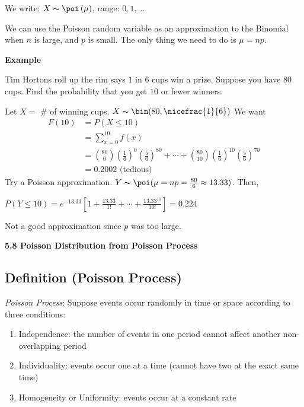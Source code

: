 We write: $ X \thicksim \poi\left(\mu\right) $, range: $ 0,1,\ldots $

We can use the Poisson random variable as an approximation to the Binomial
when $ n $ is large, and $ p $ is small. The only thing we need to do
is $ \mu=np $.

\textbf{Example}

Tim Hortons roll up the rim says $ 1 $ in $ 6 $ cups win a prize. Suppose
you have $ 80 $ cups. Find the probability that you get $ 10 $ or fewer
winners.

Let $ X= $ \# of winning cups. $ X \thicksim \bin(80,\nicefrac{1}{6}) $
We want
\begin{align*}
    F(10)&=P(X\le 10)\\
    &=\sum\limits_{x=0}^{10} f(x)\\
    &=\binom{80}{0}\left(\frac{1}{6}\right)^0\left(\frac{5}{6}\right)^{80}+\cdots+
    \binom{80}{10}\left(\frac{1}{6}\right)^{10}\left(\frac{5}{6}\right)^{70}\\
    &=0.2002 \text{ (tedious) }
\end{align*}
Try a Poisson approximation.
$ Y \thicksim \poi(\mu=np=\frac{80}{6}\approx 13.33) $. Then, 

$ P(Y\le 10)=e^{-13.33}\left[1+\frac{13.33}{1!}+\cdots+\frac{13.33^{10}}{10!}\right]=0.224 $

Not a good approximation since $ p $ was too large.

\textbf{5.8 Poisson Distribution from Poisson Process}

\begin{defbox}
    \subsection{Definition (Poisson Process)}
    \emph{Poisson Process}:
    Suppose events occur randomly in time or space according to three conditions:
    \begin{enumerate}[(1)]
        \item Independence: the number of events in one period cannot affect another non-overlapping period
        \item Individuality: events occur one at a time (cannot have two at the exact same time)
        \item Homogeneity or Uniformity: events occur at a constant rate
    \end{enumerate}
\end{defbox}
